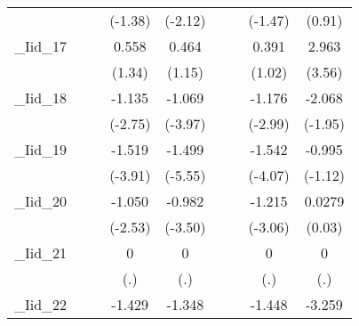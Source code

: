 {\begin{tabular}{l*{8}{c}}
            &                     &                     &     (-1.38)         &     (-2.12)         &                     &                     &     (-1.47)         &      (0.91)         \\
[1em]
\_Iid\_17     &                     &                     &       0.558         &       0.464         &                     &                     &       0.391         &       2.963\sym{***}\\
            &                     &                     &      (1.34)         &      (1.15)         &                     &                     &      (1.02)         &      (3.56)         \\
[1em]
\_Iid\_18     &                     &                     &      -1.135\sym{**} &      -1.069\sym{***}&                     &                     &      -1.176\sym{**} &      -2.068         \\
            &                     &                     &     (-2.75)         &     (-3.97)         &                     &                     &     (-2.99)         &     (-1.95)         \\
[1em]
\_Iid\_19     &                     &                     &      -1.519\sym{***}&      -1.499\sym{***}&                     &                     &      -1.542\sym{***}&      -0.995         \\
            &                     &                     &     (-3.91)         &     (-5.55)         &                     &                     &     (-4.07)         &     (-1.12)         \\
[1em]
\_Iid\_20     &                     &                     &      -1.050\sym{*}  &      -0.982\sym{***}&                     &                     &      -1.215\sym{**} &      0.0279         \\
            &                     &                     &     (-2.53)         &     (-3.50)         &                     &                     &     (-3.06)         &      (0.03)         \\
[1em]
\_Iid\_21     &                     &                     &           0         &           0         &                     &                     &           0         &           0         \\
            &                     &                     &         (.)         &         (.)         &                     &                     &         (.)         &         (.)         \\
[1em]
\_Iid\_22     &                     &                     &      -1.429\sym{***}&      -1.348\sym{***}&                     &                     &      -1.448\sym{***}&      -3.259\sym{**} \\

\end{tabular}}
